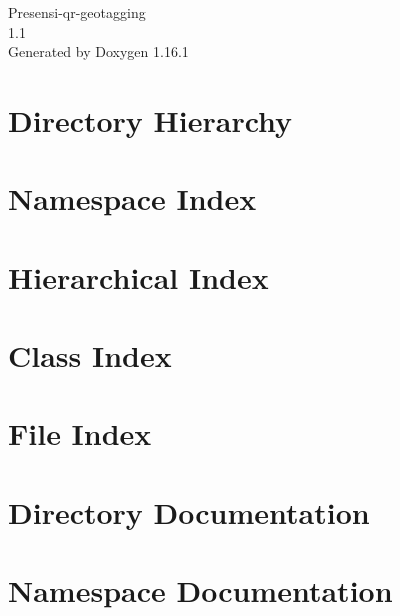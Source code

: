 \documentclass[twoside]{book}
\newcommand{\+}{\discretionary{\mbox{\scriptsize$\hookleftarrow$}}{}{}}
\newcommand{\clearemptydoublepage}{%
    \newpage{\pagestyle{empty}\cleardoublepage}%
  }
\begin{document}
  \raggedbottom
    \hypersetup{pageanchor=false,
                bookmarksnumbered=true,
                pdfencoding=unicode
               }
  \begin{titlepage}
  \vspace*{7cm}
  \begin{center}%
  {\Large Presensi-\/qr-\/geotagging}\\
  [1ex]\large 1.\+1 \\
  \vspace*{1cm}
  {\large Generated by Doxygen 1.16.1}\\
  \end{center}
  \end{titlepage}
  \clearemptydoublepage
  \tableofcontents
  \clearemptydoublepage
  \hypersetup{pageanchor=true}
\chapter{Directory Hierarchy}

\chapter{Namespace Index}

\chapter{Hierarchical Index}

\chapter{Class Index}

\chapter{File Index}

\chapter{Directory Documentation}



\chapter{Namespace Documentation}

\end{document}
